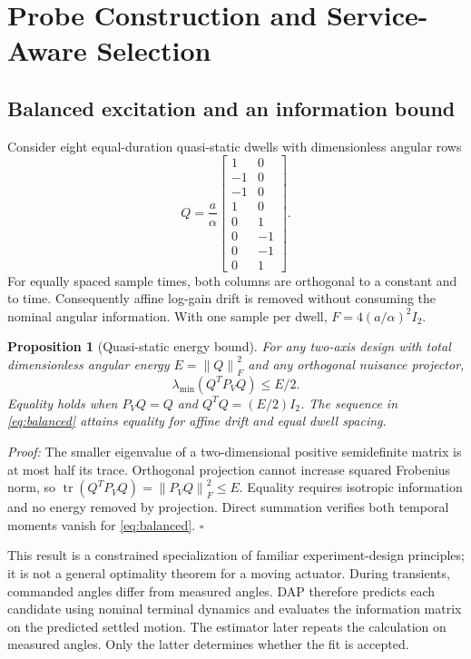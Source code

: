 \documentclass[journal]{IEEEtran}
\newtheorem{proposition}{Proposition}
\newcommand{\norm}[1]{\left\lVert#1\right\rVert}
\begin{document}
\section{Probe Construction and Service-Aware Selection}
\subsection{Balanced excitation and an information bound}
Consider eight equal-duration quasi-static dwells with dimensionless angular rows
\begin{equation}
 Q=\frac{a}{\alpha}
 \begin{bmatrix}
 1&0\\-1&0\\-1&0\\1&0\\0&1\\0&-1\\0&-1\\0&1
 \end{bmatrix}.
 \label{eq:balanced}
\end{equation}
For equally spaced sample times, both columns are orthogonal to a constant and to time. Consequently affine log-gain drift is removed without consuming the nominal angular information. With one sample per dwell, $F=4(a/\alpha)^2I_2$.

\begin{proposition}[Quasi-static energy bound]
For any two-axis design with total dimensionless angular energy $E=\norm Q_F^2$ and any orthogonal nuisance projector,
\begin{equation}
 \lambda_{\min}(Q^TP_VQ)\leq E/2.
\end{equation}
Equality holds when $P_VQ=Q$ and $Q^TQ=(E/2)I_2$. The sequence in \eqref{eq:balanced} attains equality for affine drift and equal dwell spacing.
\end{proposition}
\emph{Proof:} The smaller eigenvalue of a two-dimensional positive semidefinite matrix is at most half its trace. Orthogonal projection cannot increase squared Frobenius norm, so $\operatorname{tr}(Q^TP_VQ)=\norm{P_VQ}_F^2\leq E$. Equality requires isotropic information and no energy removed by projection. Direct summation verifies both temporal moments vanish for \eqref{eq:balanced}. $\square$

This result is a constrained specialization of familiar experiment-design principles; it is not a general optimality theorem for a moving actuator. During transients, commanded angles differ from measured angles. DAP therefore predicts each candidate using nominal terminal dynamics and evaluates the information matrix on the predicted settled motion. The estimator later repeats the calculation on measured angles. Only the latter determines whether the fit is accepted.
\end{document}
